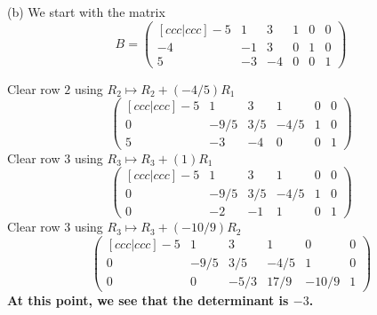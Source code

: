 \documentclass{article}
\begin{document}
\newpage


(b) We start with the matrix \[B=\begin{pmatrix}[ c c c | c c c ] -5 &
1 & 3 & 1 & 0 & 0 \\ -4 & -1 & 3 & 0 & 1 & 0 \\ 5 & -3 & -4 & 0 & 0 &
1 \end{pmatrix}\]


Clear row \(2\) using \(R_2\mapsto R_2+(-4/5)R_1\)\[\begin{pmatrix}[ c
c c | c c c ] -5 & 1 & 3 & 1 & 0 & 0 \\ 0 & -9/5 & 3/5 & -4/5 & 1 & 0
\\ 5 & -3 & -4 & 0 & 0 & 1 \end{pmatrix}\]Clear row \(3\) using
\(R_3\mapsto R_3+(1)R_1\)\[\begin{pmatrix}[ c c c | c c c ] -5 & 1 & 3
& 1 & 0 & 0 \\ 0 & -9/5 & 3/5 & -4/5 & 1 & 0 \\ 0 & -2 & -1 & 1 & 0 &
1 \end{pmatrix}\]Clear row \(3\) using \(R_3\mapsto
R_3+(-10/9)R_2\)\[\begin{pmatrix}[ c c c | c c c ] -5 & 1 & 3 & 1 & 0
& 0 \\ 0 & -9/5 & 3/5 & -4/5 & 1 & 0 \\ 0 & 0 & -5/3 & 17/9 & -10/9 &
1 \end{pmatrix}\] {\bf At this point, we see that the determinant is
\(-3\).}
\end{document}
